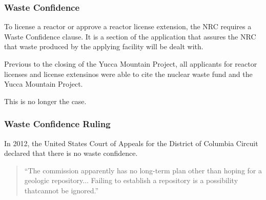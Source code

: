 
\begin{frame}
    \frametitle{Waste Confidence}
    To license a reactor or approve a reactor license extension, the NRC 
    requires a Waste Confidence clause. It is a section of the application that 
    assures the NRC that waste produced by the applying facility will be dealt 
    with. 

    Previous to the closing of the Yucca Mountain Project, all applicants for 
    reactor licenses and license extensinos were able to cite the nuclear waste 
    fund and the Yucca Mountain Project. 

    This is no longer the case. 
  \end{frame}

\begin{frame}
    \frametitle{Waste Confidence Ruling}
    In 2012, the United States Court of Appeals for the District of Columbia Circuit declared that there is no waste confidence. 
    
    \begin{quotation} 
      ``The commission apparently has no long-term plan other than hoping for a
        geologic repository... Failing to establish a repository is a
        possibility thatcannot be ignored.'' \cite{sentelle_petitions_2012} 
    \end{quotation}
  \end{frame}

